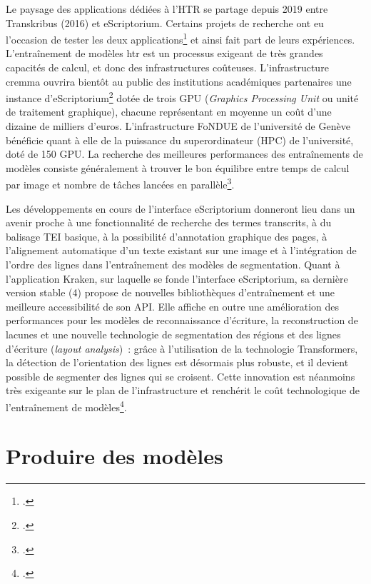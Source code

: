 \documentclass[a4paper,12pt,twoside]{book}
\begin{document}
				Le paysage des applications dédiées à l'HTR se partage depuis 2019 entre
				Transkribus (2016) et eScriptorium. Certains projets de recherche ont eu
				l'occasion de tester les deux applications\footcite{leblancTranskribusEScriptoriumRetour2022, paupeCursiveXVIIeSiecle2022} et ainsi fait part de leurs
				expériences. L'entraînement de modèles \gls{htr} est un processus exigeant de
				très grandes capacités de calcul, et donc des infrastructures coûteuses.
				L'infrastructure \gls{cremma} ouvrira bientôt au public des institutions
				académiques partenaires une instance d'eScriptorium\footcite{marguin-hamonDiscoursOuverturePresentation2022} dotée de trois GPU
				(\textit{Graphics Processing Unit} ou unité de traitement graphique),
				chacune représentant en moyenne un coût d'une dizaine de milliers
				d'euros. L'infrastructure FoNDUE de l'université de Genève bénéficie
				quant à elle de la puissance du superordinateur (HPC) de l'université,
				doté de 150 GPU. La recherche des meilleures performances des
				entraînements de modèles consiste généralement à trouver le bon
				équilibre entre temps de calcul par image et nombre de tâches lancées en
				parallèle\footcite{gabayFoNDUELightweightHTR2022}.
				
				Les développements en cours de l'interface eScriptorium donneront lieu
				dans un avenir proche à une fonctionnalité de recherche des termes
				transcrits, à du balisage TEI basique, à la possibilité d'annotation
				graphique des pages, à l'alignement automatique d'un texte existant sur
				une image et à l'intégration de l'ordre des lignes dans l'entraînement
				des modèles de segmentation. Quant à l'application Kraken, sur laquelle
				se fonde l'interface eScriptorium, sa dernière version stable (4)
				propose de nouvelles bibliothèques d'entraînement et une meilleure
				accessibilité de son API. Elle affiche en outre une amélioration des
				performances pour les modèles de reconnaissance d'écriture, la
				reconstruction de lacunes et une nouvelle technologie de segmentation
				des régions et des lignes d'écriture (\textit{layout analysis})~: grâce à
				l'utilisation de la technologie Transformers, la détection de
				l'orientation des lignes est désormais plus robuste, et il devient
				possible de segmenter des lignes qui se croisent. Cette innovation est
				néanmoins très exigeante sur le plan de l'infrastructure et renchérit le
				coût technologique de l'entraînement de modèles\footcite{kiesslingNewDevelopmentsKraken2022}.
		
		\section{Produire des modèles}
		
\end{document}
